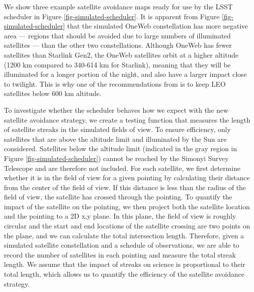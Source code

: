 \documentclass[twocolumn]{aastex631}
\begin{document}
\begin{figure*}[ht!]
\caption{Satellite avoidance maps constructed for the Rubin scheduler for each simulated constellation. Each is for a twilight observation period of 90 minutes (beginning after sunset with a Sun altitude of $-17.1$ degrees). The map projections are rotated so zenith is in the center of the image. Darker regions have more illuminated satellites and therefore more negative weighting. By varying the dodging weight placed on these maps, the scheduler will more actively avoid regions of the sky where satellites could streak images.
\label{fig-simulated-scheduler}
}
\end{figure*}

We show three example satellite avoidance maps ready for use by the LSST scheduler in Figure \ref{fig-simulated-scheduler}. It is apparent from Figure \ref{fig-simulated-scheduler} that the simulated OneWeb constellation has more negative area --- regions that should be avoided due to large numbers of illuminated satellites --- than the other two constellations. Although OneWeb has fewer satellites than Starlink Gen2, the OneWeb satellites orbit at a higher altitude (1200 km compared to 340-614 km for Starlink), meaning that they will be illuminated for a longer portion of the night, and also have a larger impact close to twilight. This is why one of the recommendations from \citet{satcon1} is to keep LEO satellites below 600 km altitude.

To investigate whether the scheduler behaves how we expect with the new satellite avoidance strategy, we create a testing function that measures the length of satellite streaks in the simulated fields of view. To ensure efficiency, only satellites that are above the altitude limit and illuminated by the Sun are considered. Satellites below the altitude limit (indicated in the gray region in Figure \ref{fig-simulated-scheduler}) cannot be reached by the Simonyi Survey Telescope and are therefore not included. For each satellite, we first determine whether it is in the field of view for a given pointing by calculating their distance from the center of the field of view. If this distance is less than the radius of the field of view, the satellite has crossed through the pointing. To quantify the impact of the satellite on the pointing, we then project both the satellite location and the pointing to a 2D x,y plane. In this plane, the field of view is roughly circular and the start and end locations of the satellite crossing are two points on the plane, and we can calculate the total intersection length. Therefore, given a simulated satellite constellation and a schedule of observations, we are able to record the number of satellites in each pointing and measure the total streak length. We assume that 
the impact of streaks on science is proportional to their total length, which allows us to quantify the efficiency of the satellite avoidance strategy. 
\end{document}
